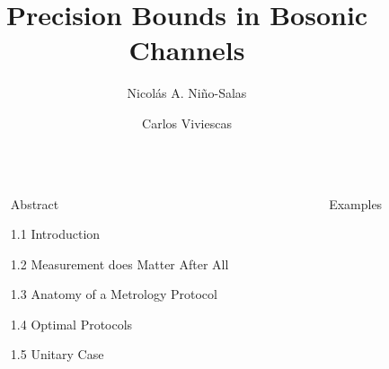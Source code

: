 \documentclass[final]{beamer}
\title{Precision Bounds in Bosonic Channels}
\author{Nicolás A. Niño-Salas \inst{1} \and Carlos Viviescas  \inst{2} }
\institute[shortinst]{Universidad Nacional de Colombia, Sede Bogotá }
\newlength{\sepwidth}
\newlength{\colwidth}
\newcommand{\separatorcolumn}{\begin{column}{\sepwidth}\end{column}}
\begin{document}
\begin{frame}[t]
\begin{columns}[t]
\separatorcolumn

\begin{column}{\colwidth}

  \begin{block}{Abstract}
  \end{block}

  \begin{block}{1.1 Introduction}
  \end{block}

  \begin{block}{1.2 Measurement does Matter After All}
  \end{block}

 \begin{alertblock}{1.3 Anatomy of a Metrology Protocol}
 \end{alertblock}

\begin{block}{1.4 Optimal Protocols}

\end{block}
\begin{block}{1.5 Unitary Case}

\end{block}


\end{column}

\separatorcolumn

\begin{column}{\colwidth}


\begin{block}{Examples}



\end{block}
\end{column}
\end{columns}
\end{frame}
\end{document}
